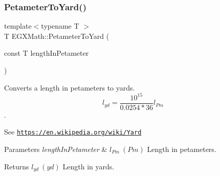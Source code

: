 \subsubsection{\texorpdfstring{Petameter\+To\+Yard()}{PetameterToYard()}}
{\footnotesize\ttfamily template$<$typename T $>$ \\
T E\+G\+X\+Math\+::\+Petameter\+To\+Yard (\begin{DoxyParamCaption}\item[{const T}]{length\+In\+Petameter }\end{DoxyParamCaption})}



Converts a length in petameters to yards. \[ l_{yd}= \frac{10^{15}}{0.0254 * 36} l_{Pm} \]. 

See \href{https://en.wikipedia.org/wiki/Yard}{\tt https\+://en.\+wikipedia.\+org/wiki/\+Yard} 
\begin{DoxyParams}{Parameters}
{\em length\+In\+Petameter} & $ l_{Pm}\ (Pm)$ Length in petameters. \\
\hline
\end{DoxyParams}
\begin{DoxyReturn}{Returns}
$ l_{yd}\ (yd)$ Length in yards. 
\end{DoxyReturn}
